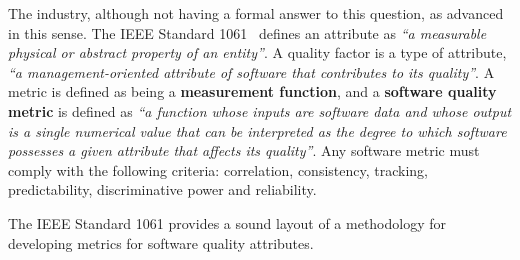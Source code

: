 \par The industry, although not having a formal answer to this question, as advanced in this sense. The IEEE Standard 1061~\cite{g1:Ieee1061:1998} defines an attribute as \emph{``a measurable physical or abstract property of an entity''}. A quality factor is a type of attribute,
\emph{``a management-oriented attribute of software that contributes to its quality''}. A metric is defined as being a {\bf measurement function}, and a {\bf software quality metric} is defined as \emph{``a function whose inputs are software data and whose output is a single numerical value that can be interpreted as the degree to which software possesses a given attribute that affects its quality''}. Any software metric must comply with the following criteria: correlation, consistency, tracking, predictability, discriminative power and reliability.
\par The IEEE Standard 1061 provides a sound layout of a methodology for developing metrics for software quality attributes.

